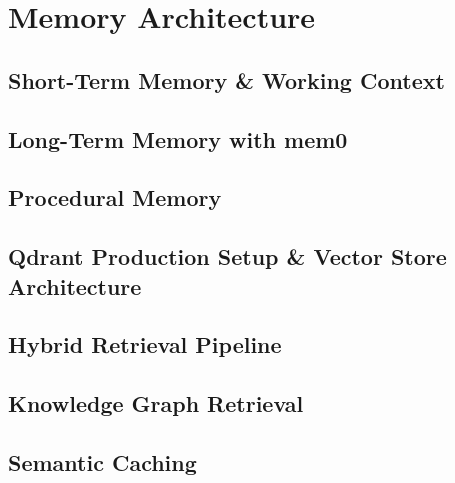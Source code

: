 \part{Memory Architecture}
\label{part:memory}

\chapter{Short-Term Memory \& Working Context}
\label{ch:short-term-memory}


\chapter{Long-Term Memory with mem0}
\label{ch:long-term-memory}


\chapter{Procedural Memory}
\label{ch:procedural-memory}


\chapter{Qdrant Production Setup \& Vector Store Architecture}
\label{ch:qdrant}


\chapter{Hybrid Retrieval Pipeline}
\label{ch:hybrid-retrieval}


\chapter{Knowledge Graph Retrieval}
\label{ch:knowledge-graph}


\chapter{Semantic Caching}
\label{ch:semantic-cache}



